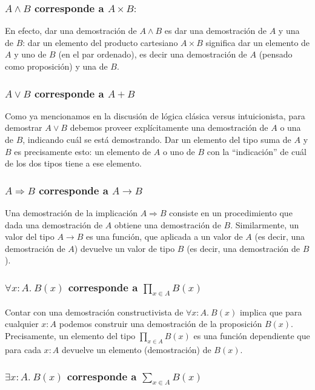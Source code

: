 \documentclass[11pt]{article} %
\begin{document}
\subsubsection*{$A \land B$ corresponde a $A \times B:$}
En efecto, dar una demostración de $A \land B$ es dar una demostración de $A$ y una de $B$: dar un elemento del producto cartesiano $A \times B$ significa dar un elemento de $A$ y uno de $B$ (en el par ordenado), es decir una demostración de $A$ (pensado como proposición) y una de $B$.

\subsubsection*{$A \vee B$ corresponde a $A + B$}
Como ya mencionamos en la discusión de lógica clásica versus intuicionista, para demostrar $A \vee B$ debemos proveer explícitamente una demostración de $A$ o una de $B$, indicando cuál se está demostrando. Dar un elemento del tipo suma de $A$ y $B$ es precisamente esto: un elemento de $A$ o uno de $B$ con la ``indicación'' de cuál de los dos tipos tiene a ese elemento. 

\subsubsection*{$A \Rightarrow B$ corresponde a $A \rightarrow B$}
Una demostración de la implicación $A \Rightarrow B$ consiste en un procedimiento que dada una demostración de $A$ obtiene una demostración de $B$. Similarmente, un valor del tipo $A \rightarrow B$ es una función, que aplicada a un valor de $A$ (es decir, una demostración de $A$) devuelve un valor de tipo $B$ (es decir, una demostración de $B$).

\subsubsection*{$∀x:A.\ B(x)$ corresponde a $\prod_{x\in A} B(x)$}

Contar con una demostración constructivista de $∀x:A.\ B(x)$ implica que para cualquier $x : A$ podemos construir una demostración de la proposición $B(x)$. Precisamente, un elemento del tipo $\prod_{x\in A} B(x)$ es una función dependiente que para cada $x : A$ devuelve un elemento (demostración) de $B(x)$.

\subsubsection*{$\exists x:A.\ B(x)$ corresponde a $\sum_{x\in A} B(x)$}
\end{document}
